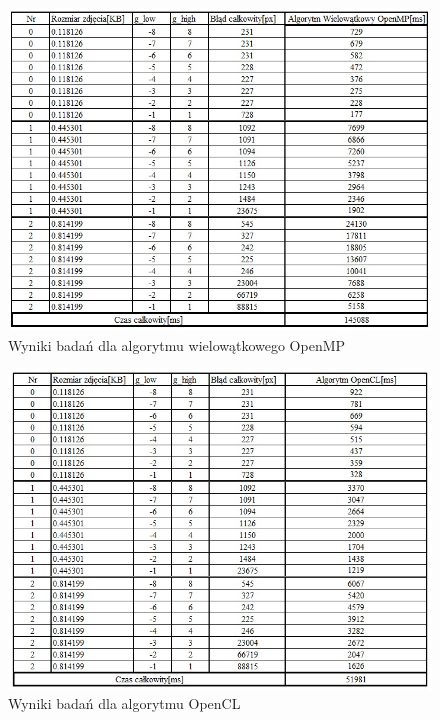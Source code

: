 \documentclass[document.tex]{subfiles}
\begin{document}
\begin{figure}[h]
\includegraphics[scale=0.75]{imgs/results_lap_openmp_threads.jpg}
\caption{Wyniki badań dla algorytmu wielowątkowego OpenMP}
\label{fig:results_lap_openmp_threads}
\end{figure}

\begin{figure}[h]
\includegraphics[scale=0.75]{imgs/results_lap_gpu.jpg}
\caption{Wyniki badań dla algorytmu OpenCL}
\label{fig:results_lap_gpu}
\end{figure}
\end{document}
